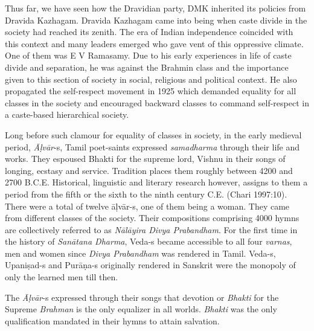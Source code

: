 Thus far, we have seen how the Dravidian party, DMK inherited its policies from Dravida Kazhagam. Dravida Kazhagam came into being when caste divide in the society had reached its zenith. The era of Indian independence coincided with this context and many leaders emerged who gave vent of this oppressive climate. One of them was E V Ramasamy. Due to his early experiences in life of caste divide and separation, he was against the Brahmin class and the importance given to this section of society in social, religious and political context. He also propagated the self-respect movement in 1925 which demanded equality for all classes in the society and encouraged backward classes to command self-respect in a caste-based hierarchical society.

Long before such clamour for equality of classes in society, in the early medieval period, \textit{Āḷvār}-s, Tamil poet-saints expressed \textit{samadharma} through their life and works. They espoused Bhakti for the supreme lord, Vishnu in their songs of longing, ecstasy and service. Tradition places them roughly between 4200 and 2700 B.C.E. Historical, linguistic and literary research however, assigns to them a period from the fifth or the sixth to the ninth century C.E. (Chari 1997:10). There were a total of twelve āḷvār-s, one of them being a woman. They came from different classes of the society. Their compositions comprising 4000 hymns are collectively referred to as \textit{Nālāyira Divya Prabandham}. For the first time in the history of \textit{Sanātana Dharma}, Veda-s became accessible to all four \textit{varnas}, men and women since \textit{Divya Prabandham }was rendered in Tamil. Veda-s, Upaniṣad-s and Purāṇa-s originally rendered in Sanskrit were the monopoly of only the learned men till then.

The \textit{Āḷvār}-s expressed through their songs that devotion or\textit{ Bhakti} for the Supreme \textit{Brahman} is the only equalizer in all worlds. \textit{Bhakti }was the only qualification mandated in their hymns to attain salvation.

